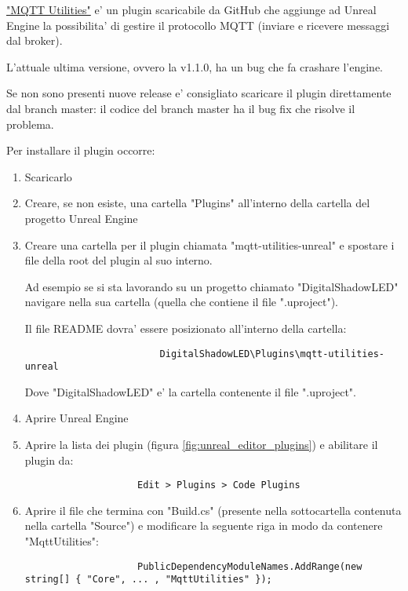         \href{https://github.com/NinevaStudios/mqtt-utilities-unreal}{"MQTT Utilities"} e' un plugin scaricabile da GitHub che aggiunge ad Unreal Engine
        la possibilita' di gestire il protocollo MQTT (inviare e ricevere messaggi dal broker).

        \begin{warningbox}
            L'attuale ultima versione, ovvero la v1.1.0, ha un bug che fa crashare l'engine.

            Se non sono presenti nuove release e' consigliato scaricare il plugin direttamente dal branch master:
            il codice del branch master ha il bug fix che risolve il problema.
        \end{warningbox}

        Per installare il plugin occorre:
        \begin{enumerate}
            \item Scaricarlo
            \item Creare, se non esiste, una cartella "Plugins" all'interno della cartella del progetto Unreal Engine
            \item Creare una cartella per il plugin chiamata "mqtt-utilities-unreal" e spostare i file della root del plugin al suo interno.

                \begin{notebox}
                    Ad esempio se si sta lavorando su un progetto chiamato "DigitalShadowLED" navigare nella sua cartella (quella che contiene il file ".uproject").

                    Il file README dovra' essere posizionato all'interno della cartella:

                    \begin{lstlisting}
                        DigitalShadowLED\Plugins\mqtt-utilities-unreal
                    \end{lstlisting}

                    Dove "DigitalShadowLED" e' la cartella contenente il file ".uproject".
                \end{notebox}

            \item Aprire Unreal Engine
            \item Aprire la lista dei plugin (figura \ref{fig:unreal_editor_plugins}) e abilitare il plugin da:

                \begin{lstlisting}
                    Edit > Plugins > Code Plugins
                \end{lstlisting}

            \item Aprire il file che termina con "Build.cs" (presente nella sottocartella contenuta nella cartella "Source") e modificare la seguente riga in modo da contenere "MqttUtilities":

                \begin{verbatim}
                    PublicDependencyModuleNames.AddRange(new string[] { "Core", ... , "MqttUtilities" });
                \end{verbatim}
        \end{enumerate}


